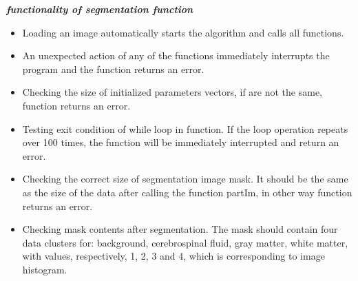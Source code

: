 \textit{\textbf{functionality of segmentation function}}
\begin{itemize}
	\item Loading an image automatically starts the algorithm and calls all functions.
	\item An unexpected action of any of the functions immediately interrupts the program and the function returns an error.
	\item Checking the size of initialized parameters vectors, if are not the same, function returns an error. 
	\item Testing exit condition of while loop in function. If the loop operation repeats over 100 times, the function will be immediately interrupted and return an error. 
	\item Checking the correct size of segmentation image mask. It should be the same as the size of the data after calling the function partIm, in other way function returns an error.
	\item Checking mask contents after segmentation. The mask should contain four data clusters for: background, cerebrospinal fluid,  gray matter, white matter, with values, respectively, 1, 2, 3 and 4, which is corresponding to image histogram.
\end{itemize}

